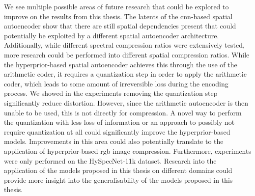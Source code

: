 We see multiple possible areas of future research that could be explored to improve on the results from this thesis. The latents of the \ac{cnn}-based spatial autoencoder show that there are still spatial dependencies present that could potentially be exploited by a different spatial autoencoder architecture. Additionally, while different spectral compression ratios were extensively tested, more research could be performed into different spatial compression ratios. While the hyperprior-based spatial autoencoder achieves this through the use of the arithmetic coder, it requires a quantization step in order to apply the arithmetic coder, which leads to some amount of irreversible loss during the encoding process. We showed in the experiments removing the quantization step significantly reduce distortion. However, since the arithmetic autoencoder is then unable to be used, this is not directly for compression. A novel way to perform the quantization with less loss of information or an approach to possibly not require quantization at all could significantly improve the hyperprior-based models. Improvements in this area could also potentially translate to the application of hyperprior-based \ac{rgb} image compression. Furthermore, experiments were only performed on the HySpecNet-11k dataset. Research into the application of the models proposed in this thesis on different domains could provide more insight into the generalisability of the models proposed in this thesis. 